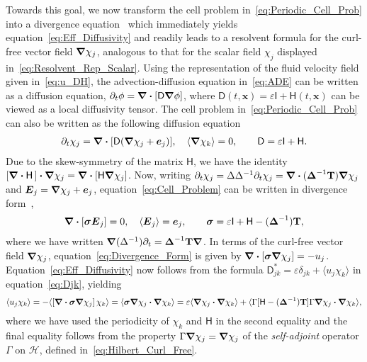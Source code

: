 \documentclass[leqno,onefignum,onetabnum]{siamltex1213}
\newcommand{\Tb}{\mathbf{T}}
\newcommand{\Hc}{\mathcal{H}}
\newcommand{\Dm}{\mathsf{D}}
\newcommand{\Hm}{\mathsf{H}}
\newcommand{\Ib}{\mathsf{I}}
\newcommand\bsig{\mbox{\boldmath${\sigma}$}}
\newcommand\bDelta{\mbox{\boldmath${\Delta}$}}
\newcommand\bnabla{\mbox{\boldmath${\nabla}$}}
\providecommand\bcdot{\boldsymbol{\cdot}}
\newcommand{\vecE}{\boldsymbol{E}}
\newcommand{\vecx}{\boldsymbol{x}}
\newcommand{\vece}{\boldsymbol{e}}
\begin{document}
Towards this goal, we now transform the cell problem
in~\eqref{eq:Periodic_Cell_Prob} into a divergence
equation~\cite{Fannjiang:1994:SIAM_JAM:333} which immediately yields
equation~\eqref{eq:Eff_Diffusivity} and readily leads to a resolvent
formula for the curl-free vector field $\bnabla\chi_j$, analogous to that
for the scalar field $\chi_j$ displayed in~\eqref{eq:Resolvent_Rep_Scalar}. Using the
representation of the fluid velocity field given in~\eqref{eq:u_DH}, the
advection-diffusion equation in~\eqref{eq:ADE} can be written as a
diffusion equation, $\partial_t\phi=\bnabla \bcdot[\Dm\bnabla\phi]$, where
$\Dm(t,\vecx)=\varepsilon\Ib+\Hm(t,\vecx)$ can be viewed as a local diffusivity
tensor. The cell problem in~\eqref{eq:Periodic_Cell_Prob} can also be
written as the following diffusion
equation~\cite{Fannjiang:1994:SIAM_JAM:333}     
% 
\begin{align}\label{eq:Cell_Problem}
  \partial_t\chi_j=\bnabla \bcdot[\Dm(\bnabla \chi_j+\vece_j)],
  \quad
  \langle\bnabla \chi_k\rangle=0, \qquad
  \Dm=\varepsilon\Ib+\Hm.
\end{align}
%
Due to the skew-symmetry of the matrix $\Hm$, we have the identity
$[\bnabla\bcdot\Hm\,]\bcdot\bnabla\chi_j=\bnabla\bcdot[\Hm\bnabla\chi_j]$.
Now, writing $\partial_t\chi_j=\Delta\Delta^{-1}\partial_t\chi_j=\bnabla\bcdot(\bDelta^{-1}\Tb)\bnabla\chi_j$ and
$\vecE_j=\bnabla\chi_j+\vece_j$, equation~\eqref{eq:Cell_Problem} can be
written in divergence form~\cite{Fannjiang:1994:SIAM_JAM:333},   
%
\begin{align}\label{eq:Divergence_Form}
  \bnabla\bcdot[\bsig\vecE_j]=0,
  \quad
  \langle\vecE_j\rangle=\vece_j,
  \qquad
  \bsig=\varepsilon\Ib+\Hm-(\bDelta^{-1})\Tb,
\end{align}
%
where we have written
$\bnabla(\Delta^{-1})\partial_t=\bDelta^{-1}\Tb\bnabla$. In terms of the curl-free
vector field $\bnabla\chi_j$, equation~\eqref{eq:Divergence_Form} is
given by
$\bnabla\bcdot[\bsig\bnabla\chi_j]=-u_j$. Equation~\eqref{eq:Eff_Diffusivity} 
now follows from the formula $\Dm^*_{jk}=\varepsilon\delta_{jk}+\langle u_j\chi_k\rangle$ in
equation~\eqref{eq:Djk}, yielding
%
\begin{align}\label{eq:Functional_Rep}
  \langle u_j\chi_k\rangle=-\langle[\bnabla\bcdot\bsig\bnabla\chi_j]\,\chi_k\rangle
       =\langle\bsig\bnabla\chi_j\bcdot\bnabla\chi_k\rangle      
       =\varepsilon\langle\bnabla\chi_j\bcdot\bnabla\chi_k\rangle
         +\langle\Gamma[\Hm-(\bDelta^{-1})\Tb]\Gamma\bnabla\chi_j\bcdot\bnabla\chi_k\rangle,       
\end{align}
%
where we have used the periodicity of $\chi_k$ and $\Hm$ in the second
equality and the final equality follows from the property
$\Gamma\bnabla\chi_j=\bnabla\chi_j$ of the \emph{self-adjoint} operator $\Gamma$ on
$\Hc$, defined in~\eqref{eq:Hilbert_Curl_Free}.
\end{document}
